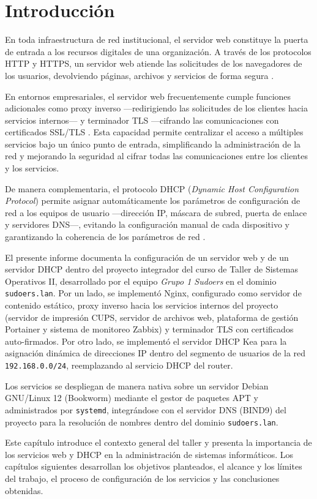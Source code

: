 
\section{Introducción}

En toda infraestructura de red institucional, el servidor web constituye la
puerta de entrada a los recursos digitales de una organización. A través de
los protocolos HTTP y HTTPS, un servidor web atiende las solicitudes de los
navegadores de los usuarios, devolviendo páginas, archivos y servicios de
forma segura \cite{tanenbaum2017}.

En entornos empresariales, el servidor web frecuentemente cumple funciones
adicionales como proxy inverso ---redirigiendo las solicitudes de los
clientes hacia servicios internos--- y terminador TLS ---cifrando las
comunicaciones con certificados SSL/TLS \cite{nginx2026}. Esta capacidad
permite centralizar el acceso a múltiples servicios bajo un único punto de
entrada, simplificando la administración de la red y mejorando la seguridad
al cifrar todas las comunicaciones entre los clientes y los servicios.

De manera complementaria, el protocolo DHCP (\textit{Dynamic Host
Configuration Protocol}) permite asignar automáticamente los parámetros de
configuración de red a los equipos de usuario ---dirección IP, máscara de
subred, puerta de enlace y servidores DNS---, evitando la configuración
manual de cada dispositivo y garantizando la coherencia de los parámetros de
red \cite{rfc2131}.

El presente informe documenta la configuración de un servidor web y de un
servidor DHCP dentro del proyecto integrador del curso de Taller de Sistemas
Operativos II, desarrollado por el equipo \textit{Grupo 1 Sudoers} en el
dominio \texttt{sudoers.lan}. Por un lado, se implementó Nginx, configurado
como servidor de contenido estático, proxy inverso hacia los servicios
internos del proyecto (servidor de impresión CUPS, servidor de archivos web,
plataforma de gestión Portainer y sistema de monitoreo Zabbix) y terminador
TLS con certificados auto-firmados. Por otro lado, se implementó el servidor
DHCP Kea para la asignación dinámica de direcciones IP dentro del segmento
de usuarios de la red \texttt{192.168.0.0/24}, reemplazando al servicio DHCP
del router.

Los servicios se despliegan de manera nativa sobre un servidor Debian GNU/Linux
12 (Bookworm) mediante el gestor de paquetes APT y administrados por
\texttt{systemd}, integrándose con el servidor DNS (BIND9) del proyecto para la
resolución de nombres dentro del dominio \texttt{sudoers.lan}.

Este capítulo introduce el contexto general del taller y presenta la
importancia de los servicios web y DHCP en la administración de sistemas
informáticos. Los capítulos siguientes desarrollan los objetivos planteados,
el alcance y los límites del trabajo, el proceso de configuración de los
servicios y las conclusiones obtenidas.